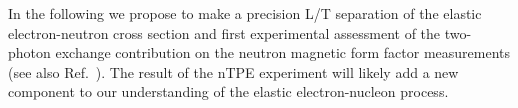 In the following we propose to make a precision L/T separation of the elastic electron-neutron cross section and first experimental assessment 
of the two-photon exchange contribution on the neutron magnetic form factor measurements (see also Ref.~\cite{Wojtsekhowski:2017kti}).
The result of the nTPE experiment will likely add a new component to our understanding of the elastic electron-nucleon process.
